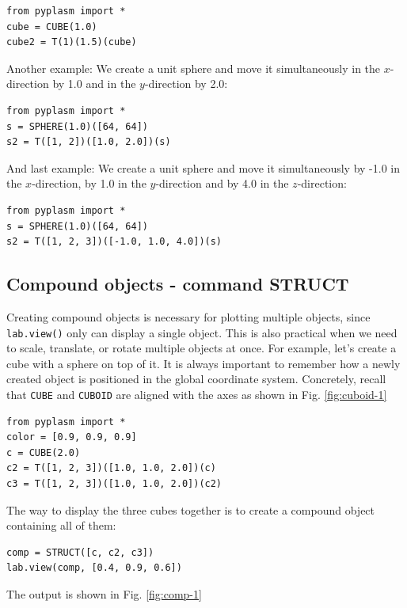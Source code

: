 \documentclass{article}
\begin{document}
\begin{verbatim}
from pyplasm import *
cube = CUBE(1.0)
cube2 = T(1)(1.5)(cube)
\end{verbatim}
Another example: We create a unit sphere and move it simultaneously 
in the $x$-direction by 1.0 and in the $y$-direction by 2.0:

\begin{verbatim}
from pyplasm import *
s = SPHERE(1.0)([64, 64])
s2 = T([1, 2])([1.0, 2.0])(s)
\end{verbatim}
And last example: We create a unit sphere and  
move it simultaneously by -1.0 in the $x$-direction, by 1.0 in the $y$-direction
and by 4.0 in the $z$-direction:

\begin{verbatim}
from pyplasm import *
s = SPHERE(1.0)([64, 64])
s2 = T([1, 2, 3])([-1.0, 1.0, 4.0])(s)
\end{verbatim}

\subsection{Compound objects - command STRUCT}

Creating compound objects is necessary
for plotting multiple objects, since {\tt lab.view()} only can 
display a single object. This is also practical 
when we need to scale, translate, or rotate multiple objects at
once. For example, let's create a cube with a sphere on top of it.
It is always important to remember how a newly created
object is positioned in the global coordinate system. Concretely,
recall that {\tt CUBE} and {\tt CUBOID} are aligned with the 
axes as shown in Fig. \ref{fig:cuboid-1}

\begin{verbatim}
from pyplasm import *
color = [0.9, 0.9, 0.9]
c = CUBE(2.0)
c2 = T([1, 2, 3])([1.0, 1.0, 2.0])(c)
c3 = T([1, 2, 3])([1.0, 1.0, 2.0])(c2)
\end{verbatim}
The way to display the three cubes together
is to create a compound object containing all of them:

\begin{verbatim}
comp = STRUCT([c, c2, c3])
lab.view(comp, [0.4, 0.9, 0.6])
\end{verbatim}
The output is shown in Fig. \ref{fig:comp-1}

\newpage
\end{document}
